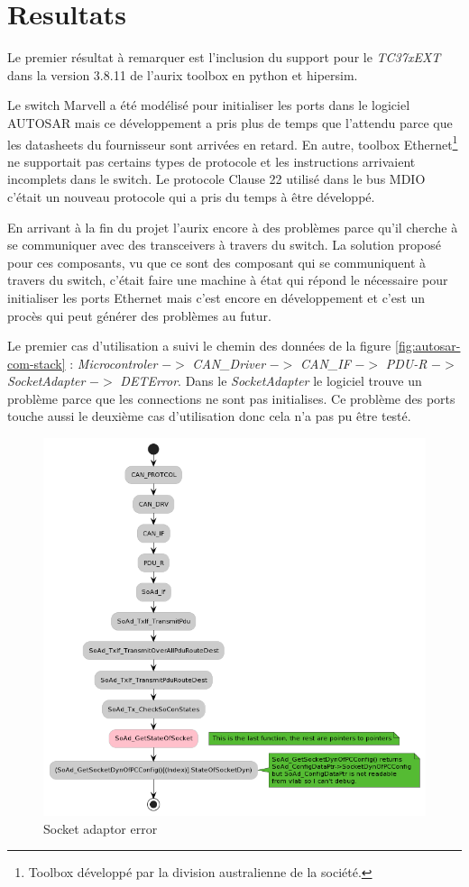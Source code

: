 \section{Resultats} 

Le premier résultat à remarquer est l'inclusion du support pour le \textit{TC37xEXT} dans la version 3.8.11 de l'aurix toolbox en python et hipersim. 

Le switch Marvell a été modélisé pour initialiser les ports dans le logiciel AUTOSAR mais ce développement a pris plus de temps que l'attendu parce que les datasheets du fournisseur sont arrivées en retard. En autre, toolbox Ethernet\footnote{Toolbox développé par la division australienne de la société.} ne supportait pas certains types de protocole et les instructions arrivaient incomplets dans le switch. Le protocole Clause 22 utilis\'e dans le bus MDIO c'était un nouveau protocole qui a pris du temps à être développé.  

En arrivant à la fin du projet l'aurix encore à des problèmes parce qu'il cherche à se communiquer avec des transceivers \`a travers du switch. La solution propos\'e pour ces composants, vu que ce sont des composant qui se communiquent \`a travers du switch, c'était faire une machine \`a état qui répond le nécessaire pour initialiser les ports Ethernet mais c'est encore en développement et c'est un procès qui peut générer des problèmes au futur. 

Le premier cas d'utilisation a suivi le chemin des données de la figure \ref{fig:autosar-com-stack} : \textit{Microcontroler} $->$ \textit{CAN\_Driver} $->$ \textit{CAN\_IF} $->$ \textit{PDU-R} $->$ \textit{SocketAdapter}\cite{sock_adp_man} $->$ \textit{DETError}\cite{det_man}. Dans le \textit{SocketAdapter} le logiciel trouve un problème parce que les connections ne sont pas initialises. Ce problème des ports touche aussi le deuxième cas d'utilisation donc cela n'a pas pu être test\'e. 

\begin{figure}[!htb] 
\centering 
\includegraphics[width=\textwidth]{img/SoAd_Error.png} 
\caption{Socket adaptor error} 
\label{fig:soad-error} 
\end{figure}

